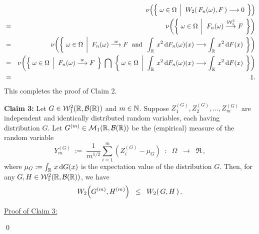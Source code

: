 \begin{eqnarray*}
&&
\nu\!\left(\left\{\;
\omega \in \Omega
\;\left\vert\;\;
W_{2}\!\left(\,F_{n}(\omega), F\,\right) \overset{\textnormal{\color{white}X}}{\longrightarrow} 0
\right.
\;\right\}\right)
\\
& = &
\nu\!\left(\left\{\;
\omega \in \Omega
\;\left\vert\;\;
F_{n}(\omega) \overset{\mathcal{W}^{2}_{1}}{\longrightarrow} F
\right.
\;\right\}\right)
\\
& = &
\nu\!\left(\left\{\;
\omega \in \Omega
\;\left\vert\;\;
F_{n}(\omega) \overset{w}{\longrightarrow} F
\;\;\textnormal{and}\;\;
\int_{\Re}\,x^{2}\,\d F_{n}(\omega)(x) \longrightarrow \int_{\Re}\,x^{2}\,\d F(x)
\right.
\;\right\}\right)
\\
& = &
\nu\!\left(
\left\{\;
\omega \in \Omega
\;\left\vert\;\;
F_{n}(\omega) \overset{w}{\longrightarrow} F
\right.
\;\right\}
\;\bigcap\;
\left\{\;
\omega \in \Omega
\;\left\vert\;\;
\int_{\Re}\,x^{2}\,\d F_{n}(\omega)(x) \longrightarrow \int_{\Re}\,x^{2}\,\d F(x)
\right.
\;\right\}
\right)
\\
&=& 1.
\end{eqnarray*}
This completes the proof of Claim 2.

\vskip 0.8cm
\begin{center}
\begin{minipage}{5.5in}
\noindent
\textbf{Claim 3:}\; Let $G \in \mathcal{W}^{2}_{1}\!\left(\mathbb{R},\mathcal{B}(\mathbb{R})\right)$ and $m \in \mathbb{N}$.
Suppose $Z^{(G)}_{1},Z^{(G)}_{2},\ldots,Z^{(G)}_{m}$ are independent and
identically distributed random variables, each having distribution $G$.
Let $G^{(m)} \in \mathcal{M}_{1}(\mathbb{R},\mathcal{B}(\mathbb{R}))$ be the (empirical) measure of the random variable
\begin{equation*}
Y_{m}^{(G)}
\; := \; \dfrac{1}{m^{1/2}} \sum_{i=1}^{m}\left(Z_{i}^{(G)} - \mu_{G}\right)
\;\; : \;\; \Omega \;\; \longrightarrow \;\; \Re\,,
\end{equation*}
where $\mu_{G} := \int_{\mathbb{R}}\,x\,\textnormal{d} G(x)$ is the expectation value of the distribution $G$.
Then, for any $G, H \in \mathcal{W}^{2}_{1}\!\left(\mathbb{R},\mathcal{B}(\mathbb{R})\right)$, we have
\begin{equation*}
W_{2}\!\left(G^{(m)},H^{(m)}\right)
\;\; \leq \;\;
W_{2}\!\left(\,G,H\,\right).
\end{equation*}
\end{minipage}
\end{center}

\noindent
\underline{Proof of Claim 3:}\;\;

\qed

